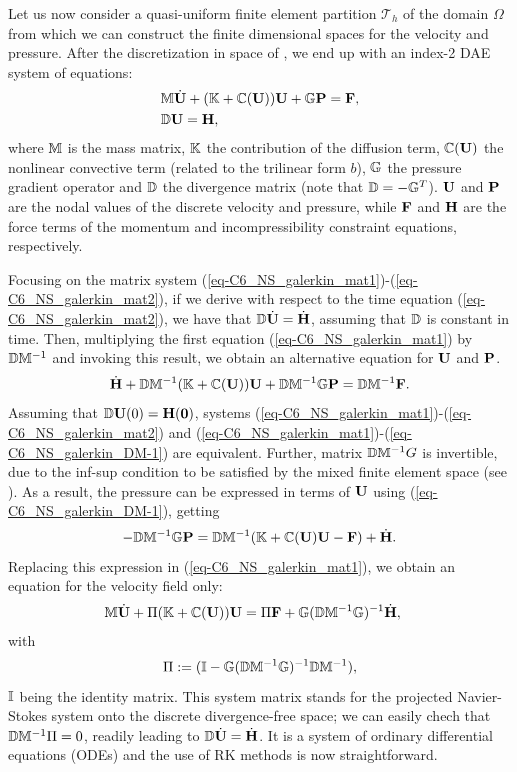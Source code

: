 Let us now consider a quasi-uniform finite element partition $\mathcal{T}_h$ of the domain $\Omega$ from which we can construct the finite dimensional spaces for the velocity and pressure. After the discretization in space of , we end up with an index-2 DAE system of equations:
\begin{align}
\label{eq-C6_NS_galerkin_mat1}
&\M\dot{\U}+(\K+\C(\U))\U+\G\P=\F,\\
\label{eq-C6_NS_galerkin_mat2}
&\D\U= \H,
\end{align}
where $\M$ is the mass matrix, $\K$ the contribution of the diffusion term, $\C(\U)$ the nonlinear convective term (related to the trilinear form $b$), $\G$ the pressure gradient operator and $\D$ the divergence matrix (note that $\D=-\G^T$). $\U$ and $\P$ are the nodal values of the discrete velocity and pressure, while $\F$ and $\H$ are the force terms of the momentum and incompressibility constraint equations, respectively. 

Focusing on the matrix system (\ref{eq-C6_NS_galerkin_mat1})-(\ref{eq-C6_NS_galerkin_mat2}), if we derive with respect to the time equation (\ref{eq-C6_NS_galerkin_mat2}), we have that $\D\dot{\U}= \dot{\H}$, assuming that $\D$ is constant in time. Then, multiplying the first equation (\ref{eq-C6_NS_galerkin_mat1}) by $\D\M^{-1}$ and invoking this result, we obtain an alternative equation for $\U$ and $\P$.
\begin{equation}
\label{eq-C6_NS_galerkin_DM-1}
\dot{\H} + \D\M^{-1}(\K+\C(\U))\U+\D\M^{-1}\G\P=\D\M^{-1}\F.
\end{equation}
Assuming that $\D\U(0) = \H(0)$, systems (\ref{eq-C6_NS_galerkin_mat1})-(\ref{eq-C6_NS_galerkin_mat2}) and (\ref{eq-C6_NS_galerkin_mat1})-(\ref{eq-C6_NS_galerkin_DM-1}) are equivalent. Further, matrix $\D\M^{-1} G$ is invertible, due to the inf-sup condition to be satisfied by the mixed finite element space (see \cite{elman_finite_2005}). As a result, the pressure can be expressed in terms of $\U$ using (\ref{eq-C6_NS_galerkin_DM-1}), getting
\begin{equation}
\label{eq-C6_NS_galerkin_DM-2}
-\D\M^{-1}\G\P=\D\M^{-1}(\K+\C(\U)\U- \F) + \dot{\H}.
\end{equation}
Replacing this expression in (\ref{eq-C6_NS_galerkin_mat1}), we obtain an equation for the velocity field only:
\begin{align}
\label{eq-C6_NS_galerkin_ou}
&\M\dot{\U}+ \Pi(\K+\C(\U))\U  = \Pi\F + \G(\D\M^{-1}\G)^{-1} \dot{\H},
\end{align}
with
$$\Pi := (\I - \G(\D\M^{-1}\G)^{-1}\D\M^{-1}),$$ 
$\I$ being the identity matrix. This system matrix stands for the projected Navier-Stokes system onto the discrete divergence-free space; we can easily chech that $\D\M^{-1}\Pi = 0$, readily leading to $\D \dot{\U} = \dot{\H}$. It is a system of ordinary differential equations (ODEs) and the use of RK methods is now straightforward. 

